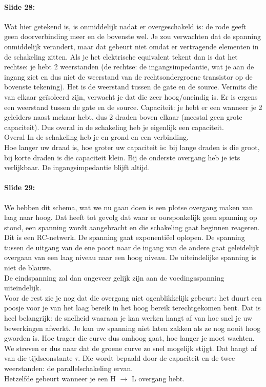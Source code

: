 \documentclass[10pt,a4paper]{book}
\begin{document}
\paragraph{Slide 28:} Wat hier getekend is, is onmiddelijk nadat er overgeschakeld is: de rode geeft geen doorverbinding meer en de bovenste wel. Je zou verwachten dat de spanning onmiddelijk verandert, maar dat gebeurt niet omdat er vertragende elementen in de schakeling zitten. Als je het elektrische equivalent tekent dan is dat het rechtse: je hebt 2 weerstanden (de rechtse: de ingangsimpedantie, wat je aan de ingang ziet en dus niet de weerstand van de rechtsondergroene transistor op de bovenste tekening). Het is de weerstand tussen de gate en de source. Vermits die van elkaar ge\"isoleerd zijn, verwacht je dat die zeer hoog/oneindig is. Er is ergens een weerstand tussen de gate en de source. Capaciteit: je hebt er een wanneer je 2 geleiders naast mekaar hebt, dus 2 draden boven elkaar (meestal geen grote capaciteit). Dus overal in de schakeling heb je eigenlijk een capaciteit.\\
Overal In de schakeling heb je en grond en een verbinding.\\
Hoe langer uw draad is, hoe groter uw capaciteit is: bij lange draden is die groot, bij korte draden is die capaciteit klein. 
Bij de onderste overgang heb je iets verlijkbaar. De ingangsimpedantie blijft altijd. 

\paragraph{Slide 29:} We hebben dit schema, wat we nu gaan doen is een plotse overgang maken van laag naar hoog. Dat heeft tot gevolg dat waar er oorsponkelijk geen spanning op stond, een spanning wordt aangebracht en die schakeling gaat beginnen reageren. Dit is een RC-netwerk. De spanning gaat exponenti\"eel oplopen. De spanning tussen de uitgang van de ene poort naar de ingang van de andere gaat geleidelijk overgaan van een laag niveau naar een hoog niveau. De uiteindelijke spanning is niet de blauwe.\\
De eindspanning zal dan ongeveer gelijk zijn aan de voedingsspanning uiteindelijk.\\
Voor de rest zie je nog dat die overgang niet ogenblikkelijk gebeurt: het duurt een poosje voor je van het laag bereik in het hoog bereik terechtgekomen bent. Dat is heel belangrijk: de snelheid waaraan je kan werken hangt af van hoe snel je uw bewerkingen afwerkt. Je kan uw spanning niet laten zakken als ze nog nooit hoog gworden is. Hoe trager die curve dus omhoog gaat, hoe langer je moet wachten. We streven er dus naar dat de groene curve zo snel mogelijk stijgt. Dat hangt af van die tijdsconstante $\tau$. Die wordt bepaald door de capaciteit en de twee weerstanden: de parallelschakeling ervan.\\
Hetzelfde gebeurt wanneer je een H $\rightarrow$ L overgang hebt. 
\end{document}
